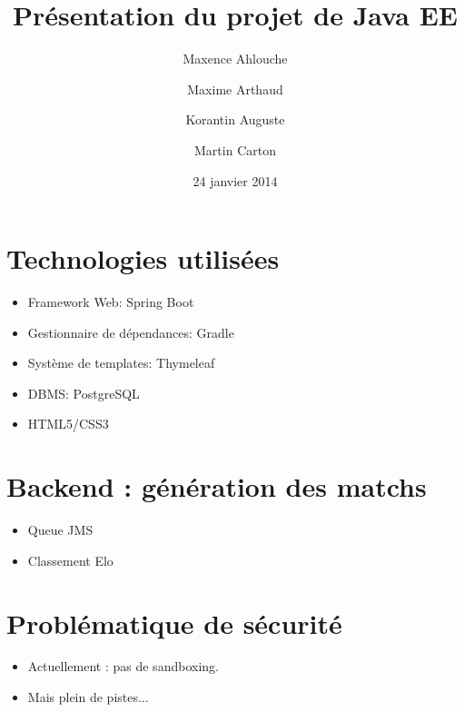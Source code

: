 \documentclass{beamer}
\title{Présentation du projet de Java EE}
\institute{Enseeiht}
\author
  [M.\ Ahlouche \and M.\ Arthaud \and K.\ Auguste \and M.\ Carton]
  {Maxence Ahlouche \and Maxime Arthaud \and Korantin Auguste \and Martin Carton}
\date{24 janvier 2014}
\begin{document}
\begin{frame}
  \titlepage
\end{frame}

\section{Technologies utilisées}
  \begin{frame}
    \begin{itemize}
      \item Framework Web: Spring Boot 
      \item Gestionnaire de dépendances: Gradle 

      \item Système de templates: Thymeleaf 
      \item DBMS: PostgreSQL 

      \item HTML5/CSS3

    \end{itemize}
  \end{frame}

\section{Backend : génération des matchs}
\begin{frame}
\begin{itemize}
  \item Queue JMS
  \item Classement Elo
\end{itemize}
\end{frame}

\section{Problématique de sécurité}
\begin{frame}
\begin{itemize}
  \item Actuellement : pas de sandboxing.
   \item Mais plein de pistes...
\end{itemize}
\end{frame}
\end{document}
